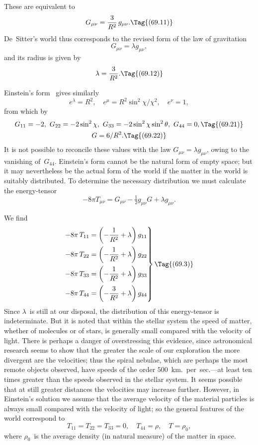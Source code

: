 \documentclass[12pt]{book}
\begin{document}
These are equivalent to
\[
G_{\mu\nu} = \frac{3}{R^{2}}\, g_{\mu\nu}.
\Tag{(69.11)}
\]
De~Sitter's world thus corresponds to the revised form of the law of gravitation
\[
G_{\mu\nu} = \lambda g_{\mu\nu},
\]
and its radius is given by
\[
\lambda = \frac{3}{R^{2}}.
\Tag{(69.12)}
\]

Einstein's form~ gives similarly
\[
e^{\lambda} = R^{2},\quad
e^{\mu} = R^{2}\sin^{2}\chi/\chi^{2},\quad
e^{\nu} = 1,
\]
from which by~
\begin{gather*}
  G_{11} = -2,\
  G_{22} = -2\sin^{2}\chi,\
  G_{33} = -2\sin^{2}\chi \sin^{2}\theta,\
  G_{44} = 0,
  \Tag{(69.21)} \\
  G = 6/R^{2}.
  \Tag{(69.22)}
\end{gather*}
It is not possible to reconcile these values with the law $G_{\mu\nu} = \lambda g_{\mu\nu}$, owing to
the vanishing of~$G_{44}$. Einstein's form cannot be the natural form of empty
space; but it may nevertheless be the actual form of the world if the matter
in the world is suitably distributed. To determine the necessary distribution
we must calculate the energy-tensor~\Eq{(54.71)}
\[
-8\pi T_{\mu\nu} = G_{\mu\nu} - \tfrac{1}{2}g_{\mu\nu}G + \lambda g_{\mu\nu}.
\]

We find
\[
\left.
\begin{aligned}
  - 8\pi\, T_{11} &= \left(-\frac{1}{R^{2}} + \lambda\right) g_{11}\\
  - 8\pi\, T_{22} &= \left(-\frac{1}{R^{2}} + \lambda\right) g_{22}\\
  - 8\pi\, T_{33} &= \left(-\frac{1}{R^{2}} + \lambda\right) g_{33}\\
  - 8\pi\, T_{44} &= \left(-\frac{3}{R^{2}} + \lambda\right) g_{44}
\end{aligned}
\right\}
\Tag{(69.3)}
\]
Since $\lambda$~is still at our disposal, the distribution of this energy-tensor is indeterminate.
But it is noted that within the stellar system the speed of matter,
whether of molecules or of stars, is generally small compared with the velocity
of light. There is perhaps a danger of overstressing this evidence, since astronomical
research seems to show that the greater the scale of our exploration
the more divergent are the velocities; thus the spiral nebulae, which are
perhaps the most remote objects observed, have speeds of the order $500$~km.\
per~sec.---at least ten times greater than the speeds observed in the stellar
system. It seems possible that at still greater distances the velocities may
increase further. However, in Einstein's solution we assume that the average
velocity of the material particles is always small compared with the velocity
of light; so the general features of the world correspond to
\index{World!mass of}%
\[
T_{11} = T_{22} = T_{33} = 0,\quad
T_{44} = \rho,\quad
T = \rho_{0},
\]
where $\rho_{0}$~is the average density (in natural measure) of the matter in space.
\end{document}
